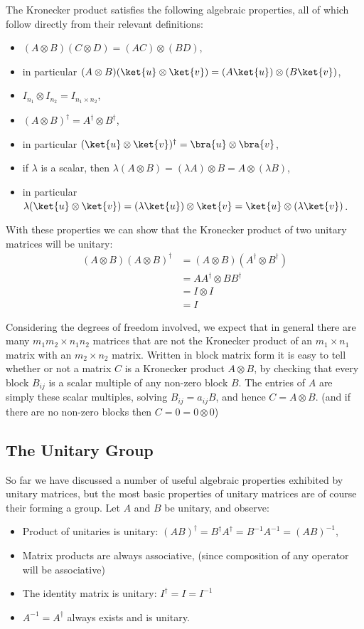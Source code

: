 The Kronecker product satisfies the following algebraic properties, all of which follow directly from their relevant definitions:
\begin{itemize}
	\item $(A\otimes B)(C \otimes D) = (AC) \otimes (BD)$,
	\item in particular $(A\otimes B)(\ket{u} \otimes \ket{v}) = (A\ket{u})\otimes (B\ket{v})$,
	\item $I_{n_1} \otimes I_{n_2} = I_{n_1\times n_2}$,
	\item $(A\otimes B)^\dagger = A^\dagger \otimes B^\dagger$,
	\item in particular $(\ket{u}\otimes \ket{v})^\dagger = \bra{u} \otimes \bra{v}$,
	\item if $\lambda$ is a scalar, then $\lambda (A \otimes B) = (\lambda A) \otimes B = A \otimes (\lambda B)$,
	\item in particular $\lambda (\ket{u} \otimes \ket{v}) = (\lambda \ket{u}) \otimes \ket{v} = \ket{u} \otimes (\lambda \ket{v})$.
\end{itemize}
With these properties we can show that the Kronecker product of two unitary matrices will be unitary:
\begin{align*}
	(A \otimes B)(A \otimes B)^\dagger
	&= (A \otimes B)(A^\dagger \otimes B^\dagger)
	\\&= AA^\dagger \otimes BB^\dagger
	\\&= I \otimes I
	\\&= I
\end{align*}

Considering the degrees of freedom involved, we expect that in general there are many $m_1m_2 \times n_1n_2$ matrices that are not the Kronecker product of an $m_1 \times n_1$ matrix with an $m_2 \times n_2$ matrix. Written in block matrix form it is easy to tell whether or not a matrix $C$ is a Kronecker product $A \otimes B$, by checking that every block $B_{ij}$ is a scalar multiple of any non-zero block $B$. The entries of $A$ are simply these scalar multiples, solving $B_{ij} = a_{ij}B$, and hence $C = A \otimes B$. (and if there are no non-zero blocks then $C = 0 = 0 \otimes 0$)
\subsection{The Unitary Group}
So far we have discussed a number of useful algebraic properties exhibited by unitary matrices, but the most basic properties of unitary matrices are of course their forming a group. Let $A$ and $B$ be unitary, and observe:
\begin{itemize}
	\item Product of unitaries is unitary: ${(AB)}^\dagger = B^\dagger A^\dagger = B^{-1}A^{-1} = {(AB)}^{-1}$,
	\item Matrix products are always associative, (since composition of any operator will be associative)
	\item The identity matrix is unitary: $I^\dagger = I = I^{-1}$
	\item $A^{-1} = A^\dagger$ always exists and is unitary.
\end{itemize}

